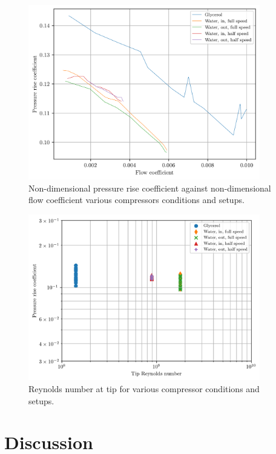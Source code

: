 \documentclass{article}
\begin{document}
\begin{figure}[H]
    \centering
    \includegraphics[width=0.9\textwidth]{compressor_non_dims.png}
    \caption{Non-dimensional pressure rise coefficient against non-dimensional flow coefficient various compressors conditions and setups.}
    \label{fig:compressor_non_dims}
\end{figure}

\begin{figure}[H]
    \centering
    \includegraphics[width=0.9\textwidth]{pressure_reynolds.png}
    \caption{Reynolds number at tip for various compressor conditions and setups.}
    \label{fig:compressor_pressure_re}
\end{figure}


\section{Discussion}
\end{document}
